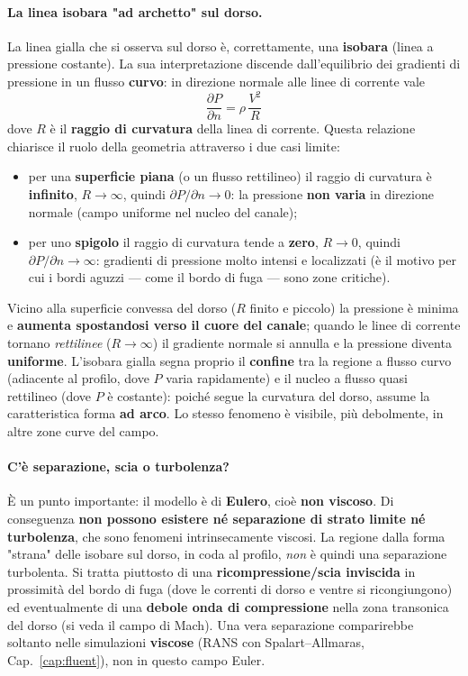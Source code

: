 \paragraph{La linea isobara "ad archetto" sul dorso.}
La linea gialla che si osserva sul dorso è, correttamente, una \textbf{isobara} (linea a pressione
costante). La sua interpretazione discende dall'equilibrio dei gradienti di pressione in un flusso
\textbf{curvo}: in direzione normale alle linee di corrente vale
\begin{equation}
  \frac{\partial P}{\partial n} = \rho\,\frac{V^2}{R}
  \label{eq:gradiente_normale}
\end{equation}
dove $R$ è il \textbf{raggio di curvatura} della linea di corrente. Questa relazione chiarisce il
ruolo della geometria attraverso i due casi limite:
\begin{itemize}
  \item per una \textbf{superficie piana} (o un flusso rettilineo) il raggio di curvatura è
    \textbf{infinito}, $R \to \infty$, quindi $\partial P/\partial n \to 0$: la pressione
    \textbf{non varia} in direzione normale (campo uniforme nel nucleo del canale);
  \item per uno \textbf{spigolo} il raggio di curvatura tende a \textbf{zero}, $R \to 0$, quindi
    $\partial P/\partial n \to \infty$: gradienti di pressione molto intensi e localizzati
    (è il motivo per cui i bordi aguzzi --- come il bordo di fuga --- sono zone critiche).
\end{itemize}
Vicino alla superficie convessa del dorso ($R$ finito e piccolo) la pressione è minima e
\textbf{aumenta spostandosi verso il cuore del canale}; quando le linee di corrente tornano
\emph{rettilinee} ($R \to \infty$) il gradiente normale si annulla e la pressione diventa
\textbf{uniforme}. L'isobara gialla segna proprio il \textbf{confine} tra la regione a flusso curvo
(adiacente al profilo, dove $P$ varia rapidamente) e il nucleo a flusso quasi rettilineo (dove $P$
è costante): poiché segue la curvatura del dorso, assume la caratteristica forma \textbf{ad arco}.
Lo stesso fenomeno è visibile, più debolmente, in altre zone curve del campo.

\paragraph{C'è separazione, scia o turbolenza?}
È un punto importante: il modello è di \textbf{Eulero}, cioè \textbf{non viscoso}. Di conseguenza
\textbf{non possono esistere né separazione di strato limite né turbolenza}, che sono fenomeni
intrinsecamente viscosi. La regione dalla forma "strana" delle isobare sul dorso, in coda al
profilo, \emph{non} è quindi una separazione turbolenta. Si tratta piuttosto di una
\textbf{ricompressione/scia inviscida} in prossimità del bordo di fuga (dove le correnti di dorso e
ventre si ricongiungono) ed eventualmente di una \textbf{debole onda di compressione} nella zona
transonica del dorso (si veda il campo di Mach). Una vera separazione comparirebbe soltanto nelle
simulazioni \textbf{viscose} (RANS con Spalart--Allmaras, Cap.~\ref{cap:fluent}), non in questo
campo Euler.

